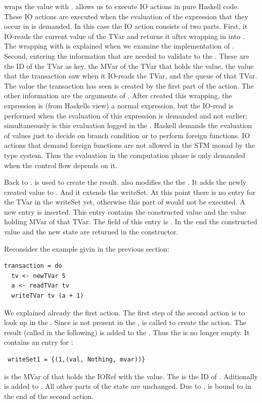  wraps
the value with .  allows us to execute IO actions in pure
Haskell code. These IO actions are executed when the evaluation of the expression that they occur in 
is demanded. In this case the IO action consists of two parts. First, it IO-reads the 
current value of the TVar and returns it after wrapping in into . The wrapping with 
 is explained when we examine the implementation of . Second, entering the 
information that are needed to validate to the . These are the ID of the TVar as 
key, the MVar of the TVar that holds the value, the value that the transaction saw when it IO-reads
the TVar, and the queue of that TVar. The value the transaction has seen is created by the first 
part of the  action. The other information are the arguments of . After 
created this wrapping, the expression is (from Haskells view) a normal expression, but the IO-read is
performed when the evaluation of this expression is demanded and not earlier; simultaneously is this 
evaluation logged in the . Haskell demands the evaluation of values just to decide on
branch condition or to perform foreign functions. IO actions that demand foreign functions are not allowed in the STM monad by the type
system. Thus the evaluation in the computation phase is only demanded when the control flow depends 
on it. 

Back to .  is used to create the result.  also modifies the 
the . It adds the newly created value to . And it extends the writeSet.
At this point there is no entry for the TVar in the writeSet yet, otherwise this part of 
would not be executed. A new entry is inserted. This entry contains the constructed value and 
the value holding MVar of that TVar. The  field of this entry is .
In the end the constructed value and the new state are returned in the  constructor.

Reconsider the example givin in the previous section:
\begin{lstlisting}
transaction = do 
  tv <- newTVar 5
  a <- readTVar tv
  writeTVar tv (a + 1)
\end{lstlisting}
We explained already the first action. The first step of the second action is to look up 
in the . Since  is not present in the ,  is
called to create the  action. The result (called  in the 
following) is added to the . Thus the  is no longer empty. It contains 
an entry for :
\begin{lstlisting}
 writeSet1 = {(1,(val, Nothing, mvar))}
\end{lstlisting}
 is the MVar of  that holds the IORef with the value. The  is the
ID of . Aditionally is  
added to . All other parts of the state are unchanged. Due to \code{<-},  is 
bound to  in the end of the second action. 


